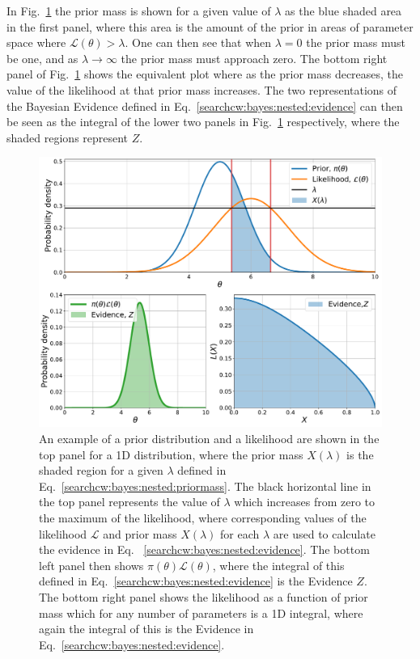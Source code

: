 In Fig.~\ref{cwinto:bayes:nestedsampling:plots} the prior mass is shown for a
given value of $\lambda$ as the blue shaded area in the first panel, where this area is the amount of the prior in areas of parameter space where $\mathcal{L}(\theta) > \lambda$.
One can then see that when $\lambda= 0$ the prior mass must be one, and as $\lambda \rightarrow \infty$ the prior mass must approach zero. The bottom right panel of Fig.~\ref{cwinto:bayes:nestedsampling:plots} shows the equivalent plot where as the prior mass decreases, the value of the likelihood at that prior mass increases.
The two representations of the Bayesian Evidence defined in Eq.~\ref{searchcw:bayes:nested:evidence} can then be seen as the integral of the lower two panels in Fig.~\ref{cwinto:bayes:nestedsampling:plots} respectively, where the shaded regions represent $Z$. 
%
\begin{figure}[ht]
	\centering
	\includegraphics[width=0.8\linewidth]{C2_cw/nested_plots.pdf}
        \caption[Nested sampling]{An example of a prior distribution and a
likelihood are shown in the top panel for a 1D distribution, where the prior
mass $X(\lambda)$ is the shaded region for a given $\lambda$ defined in
Eq.~\ref{searchcw:bayes:nested:priormass}. The black horizontal line in the top panel represents the value of $\lambda$ which increases from zero to the maximum of the likelihood, where corresponding values of the likelihood $\mathcal{L}$ and prior mass $X(\lambda)$ for each $\lambda$ are used to calculate the evidence in Eq.~ \ref{searchcw:bayes:nested:evidence}. The bottom left panel then shows
$\pi(\theta)\mathcal{L}(\theta)$, where the integral of this defined in
Eq.~\ref{searchcw:bayes:nested:evidence} is the Evidence $Z$. The bottom right
panel shows the likelihood as a function of prior mass which for any number of
parameters is a 1D integral, where again the integral of this is the Evidence
in Eq.~\ref{searchcw:bayes:nested:evidence}.}
\label{cwinto:bayes:nestedsampling:plots}

\end{figure}
%

